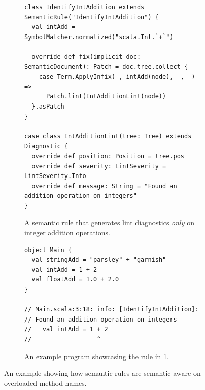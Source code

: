 \documentclass[../../main.tex]{subfiles}
\begin{document}
\begin{figure}[htb]
\begin{subfigure}{\textwidth}
\begin{verbatim}
class IdentifyIntAddition extends SemanticRule("IdentifyIntAddition") {
  val intAdd = SymbolMatcher.normalized("scala.Int.`+`")

  override def fix(implicit doc: SemanticDocument): Patch = doc.tree.collect {
    case Term.ApplyInfix(_, intAdd(node), _, _) =>
      Patch.lint(IntAdditionLint(node))
  }.asPatch
}

case class IntAdditionLint(tree: Tree) extends Diagnostic {
  override def position: Position = tree.pos
  override def severity: LintSeverity = LintSeverity.Info
  override def message: String = "Found an addition operation on integers"
}
\end{verbatim}
\caption{A semantic rule that generates lint diagnostics \emph{only} on integer addition operations.}
\label{fig:semantic-rule-ex-impl}
\end{subfigure}
%
\begin{subfigure}{\textwidth}
\vspace{3ex}
\begin{verbatim}
object Main {
  val stringAdd = "parsley" + "garnish"
  val intAdd = 1 + 2
  val floatAdd = 1.0 + 2.0
}

// Main.scala:3:18: info: [IdentifyIntAddition]:
// Found an addition operation on integers
//   val intAdd = 1 + 2
//                  ^
\end{verbatim}
\caption{An example program showcasing the rule in \cref{fig:semantic-rule-ex-impl}.}
\label{fig:semantic-rule-ex-example}
\end{subfigure}
\caption{An example showing how semantic rules are semantic-aware on overloaded method names.}
\label{fig:semantic-rule-ex}
\end{figure}

\end{document}
